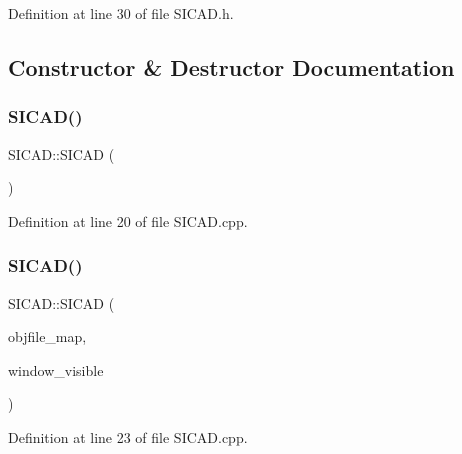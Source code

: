 Definition at line 30 of file S\+I\+C\+A\+D.\+h.



\subsection{Constructor \& Destructor Documentation}
\mbox{\label{classSICAD_a6fe9d4a644f468438264842896684a2c}} 
\subsubsection{\texorpdfstring{S\+I\+C\+A\+D()}{SICAD()}\hspace{0.1cm}{\footnotesize\ttfamily [1/9]}}
{\footnotesize\ttfamily S\+I\+C\+A\+D\+::\+S\+I\+C\+AD (\begin{DoxyParamCaption}{ }\end{DoxyParamCaption})}



Definition at line 20 of file S\+I\+C\+A\+D.\+cpp.

\mbox{\label{classSICAD_af6f17b4221b2d2725de7663c1a990175}} 
\subsubsection{\texorpdfstring{S\+I\+C\+A\+D()}{SICAD()}\hspace{0.1cm}{\footnotesize\ttfamily [2/9]}}
{\footnotesize\ttfamily S\+I\+C\+A\+D\+::\+S\+I\+C\+AD (\begin{DoxyParamCaption}\item[{const \mbox{\hyperlink{classSICAD_a9e1e1460d4c0f331b4fd015aae4dd721}{Model\+Path\+Container}} \&}]{objfile\+\_\+map,  }\item[{const bool}]{window\+\_\+visible }\end{DoxyParamCaption})}



Definition at line 23 of file S\+I\+C\+A\+D.\+cpp.

\mbox{\label{classSICAD_aa3cd941a7aa5f6620c6591c3b21a081c}} 
